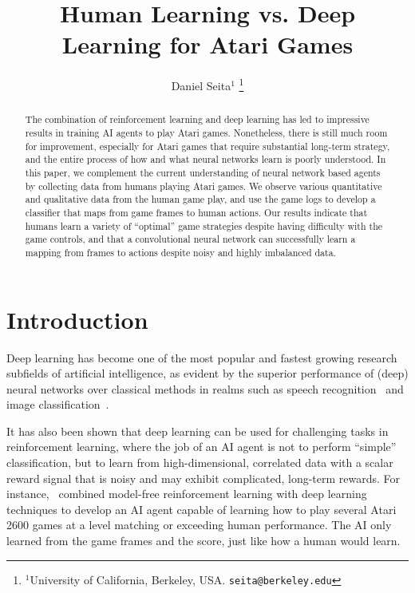 \documentclass[letterpaper, 10 pt, conference]{ieeeconf}  %
\title{\LARGE \bf
Human Learning vs. Deep Learning for Atari Games
}
\author{Daniel Seita$^{1}$%
\thanks{$^{1}$University of California, Berkeley, USA. {\tt\small seita@berkeley.edu}}%
}
\begin{document}
\maketitle
\thispagestyle{empty}
\pagestyle{empty}

\begin{abstract}

The combination of reinforcement learning and deep learning has led to impressive results in
training AI agents to play Atari games. Nonetheless, there is still much room for improvement,
especially for Atari games that require substantial long-term strategy, and the entire process of
how and what neural networks learn is poorly understood. In this paper, we complement the current
understanding of neural network based agents by collecting data from humans playing Atari games. 
We observe various quantitative and qualitative data from the human game play, and use the game logs
to develop a classifier that maps from game frames to human actions. Our results indicate that
humans learn a variety of ``optimal'' game strategies despite having difficulty with the game
controls, and that a convolutional neural network can successfully learn a mapping from frames to
actions despite noisy and highly imbalanced data.

\end{abstract}


\section{Introduction}\label{sec:intro}

Deep learning has become one of the most popular and fastest growing research subfields of
artificial intelligence, as evident by the superior performance of (deep) neural networks over
classical methods in realms such as speech recognition~\cite{speech} and image
classification~\cite{image_classification}.

It has also been shown that deep learning can be used for challenging tasks in reinforcement
learning, where the job of an AI agent is not to perform ``simple'' classification, but to learn
from high-dimensional, correlated data with a scalar reward signal that is noisy and may exhibit
complicated, long-term rewards. For instance,~\cite{mnih-atari-2013} combined model-free
reinforcement learning with deep learning techniques to develop an AI agent capable of learning how
to play several Atari 2600 games at a level matching or exceeding human performance. The AI only
learned from the game frames and the score, just like how a human would learn.
\end{document}
